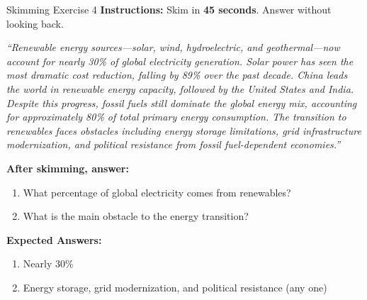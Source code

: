 \documentclass[12pt,a4paper]{article}
\begin{document}
\begin{practicebox}{Skimming Exercise 4}
\textbf{Instructions:} Skim in \textbf{45 seconds}. Answer without looking back.

\textit{``Renewable energy sources---solar, wind, hydroelectric, and geothermal---now account for nearly 30\% of global electricity generation. Solar power has seen the most dramatic cost reduction, falling by 89\% over the past decade. China leads the world in renewable energy capacity, followed by the United States and India. Despite this progress, fossil fuels still dominate the global energy mix, accounting for approximately 80\% of total primary energy consumption. The transition to renewables faces obstacles including energy storage limitations, grid infrastructure modernization, and political resistance from fossil fuel-dependent economies.''}

\textbf{After skimming, answer:}
\begin{enumerate}[noitemsep]
    \item What percentage of global electricity comes from renewables?
    \item What is the main obstacle to the energy transition?
\end{enumerate}
\textbf{Expected Answers:}
\begin{enumerate}[noitemsep]
    \item Nearly 30\%
    \item Energy storage, grid modernization, and political resistance (any one)
\end{enumerate}
\end{practicebox}
\end{document}
